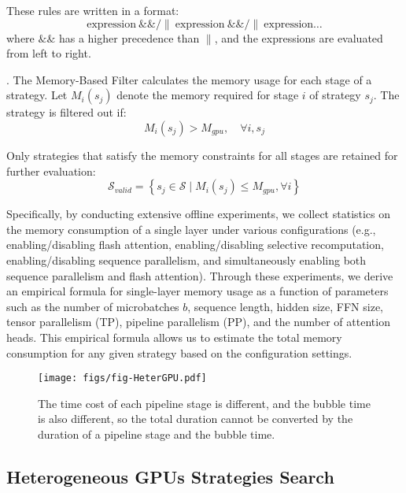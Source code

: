 These rules are written in a format:
\begin{equation}
    \text{expression} \ \&\&/\| \ \text{expression} \ \&\&/\| \ \text{expression} \dots
\end{equation}
where $\&\&$ has a higher precedence than $\|$, and the expressions are evaluated from left to right.

. The Memory-Based Filter calculates the memory usage for each stage of a strategy. Let $M_i(s_j)$ denote the memory required for stage $i$ of strategy $s_j$. The strategy is filtered out if:
\begin{equation}
    M_i(s_j) > M_{gpu}, \quad \forall i, s_j
\end{equation}

Only strategies that satisfy the memory constraints for all stages are retained for further evaluation:
\begin{equation}
    \mathcal{S}_{valid} = \left\{ s_j \in \mathcal{S} \mid M_i(s_j) \leq M_{gpu}, \forall i \right\}
\end{equation}

Specifically, by conducting extensive offline experiments, we collect statistics on the memory consumption of a single layer under various configurations (e.g., enabling/disabling flash attention, enabling/disabling selective recomputation, enabling/disabling sequence parallelism, and simultaneously enabling both sequence parallelism and flash attention). Through these experiments, we derive an empirical formula for single-layer memory usage as a function of parameters such as the number of microbatches $b$, sequence length, hidden size, FFN size, tensor parallelism (TP), pipeline parallelism (PP), and the number of attention heads. This empirical formula allows us to estimate the total memory consumption for any given strategy based on the configuration settings.

\begin{figure*}[htb!]
\centering
\texttt{[image: figs/fig-HeterGPU.pdf]}
\caption{
    The time cost of each pipeline stage is different, and the bubble time is also different, so the total duration cannot be converted by the duration of a pipeline stage and the bubble time.
}
\label{fig:heter}
\end{figure*}

\subsection{Heterogeneous GPUs Strategies Search}\label{sec:scheme:heter}

